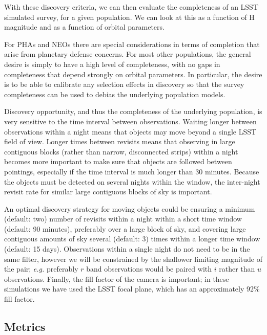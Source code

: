 With these discovery criteria, we can then evaluate the completeness
of an LSST simulated survey, for a given population. We can look at
this as a function of H magnitude and as a function of orbital
parameters.

For PHAs and NEOs there are special considerations in terms of
completion that arise from planetary defense concerns. For most other
populations, the general desire is simply to have a high level of
completeness, with no gaps in completeness that depend strongly on
orbital parameters. In particular, the desire is to be able to
calibrate any selection effects in discovery so that the survey completeness can
be used to debias the underlying population models.

Discovery opportunity, and thus the completeness of the underlying
population, is very sensitive to the time interval between
observations. Waiting longer between observations within a night means that objects
may move beyond a single LSST field of view. Longer times between
revisits means that observing in large contiguous blocks (rather than
narrow, disconnected strips) within a night becomes more important to make sure that
objects are followed between pointings, especially if the time
interval is much longer than 30 minutes. Because the objects must be
detected on several nights within the window, the inter-night revisit
rate for similar large contiguous blocks of sky is important.

An optimal discovery strategy for moving
objects could be ensuring a minimum (default: two) number of revisits
within a night within a short time window (default: 90 minutes),
preferably over a large block of sky, and
covering large contiguous amounts of sky several (default: 3) times within a
longer time window (default: 15 days).  Observations within a single
night do not need to be in the same filter, however we will be
constrained by the shallower limiting magnitude of the pair; {\it e.g.}
preferably $r$ band observations would be paired with $i$ rather than
$u$ observations. Finally, the fill factor of the camera is important;
in these simulations we have used the LSST focal plane, which has an
approximately 92\% fill factor.


\subsection{Metrics}
\label{sec:\secname:metrics}

